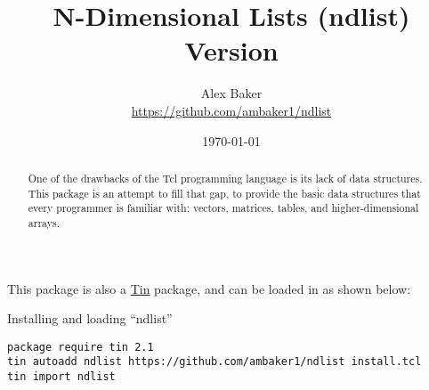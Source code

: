 \documentclass{article}
\title{\Huge{N-Dimensional Lists (ndlist)}\\\large Version \version}
\author{Alex Baker\\\small\url{https://github.com/ambaker1/ndlist}}
\date{\small\today}
\begin{document}
\maketitle
\begin{abstract}
One of the drawbacks of the Tcl programming language is its lack of data structures. This package is an attempt to fill that gap, to provide the basic data structures that every programmer is familiar with: vectors, matrices, tables, and higher-dimensional arrays.
\end{abstract}
\vspace{20 pt}

This package is also a \textcolor{blue}{\href{https://github.com/ambaker1/Tin}{Tin}} package, and can be loaded in as shown below:
\begin{example}{Installing and loading ``ndlist''}
\begin{lstlisting}
package require tin 2.1
tin autoadd ndlist https://github.com/ambaker1/ndlist install.tcl
tin import ndlist
\end{lstlisting}
\end{example}

\clearpage





\printindex
\end{document}

